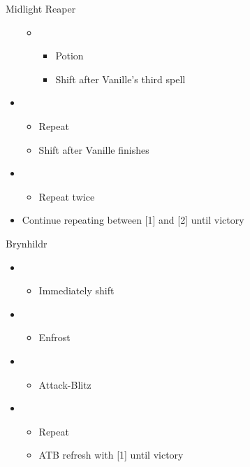 \begin{battle}[1:10]{Midlight Reaper}
\begin{itemize}
\begin{itemize}
\begin{itemize}
				            \end{itemize}
				      \item \sixth
				            \begin{itemize}
					            \item Potion
					            \item Shift after Vanille's third spell
				            \end{itemize}
			      \end{itemize}
			\item \first
			      \begin{itemize}
				      \item Repeat
				      \item Shift after Vanille finishes
			      \end{itemize}
			\item \second
			      \begin{itemize}
				      \item Repeat twice
			      \end{itemize}
			\item Continue repeating between [1] and [2] until victory
		\end{itemize}
	\end{battle}

	\begin{battle}[0:52]{Brynhildr}
		\begin{itemize}
			\item \first
			      \begin{itemize}
				      \item Immediately shift
			      \end{itemize}
			\item \third
			      \begin{itemize}
				      \item Enfrost
			      \end{itemize}
			\item \first
			      \begin{itemize}
				      \item Attack-Blitz
			      \end{itemize}
			\item \second
			      \begin{itemize}
				      \item Repeat
				      \item ATB refresh with [1] until victory
			      \end{itemize}
		\end{itemize}
	\end{battle}
	\vfill
	\ 
	\columnbreak
